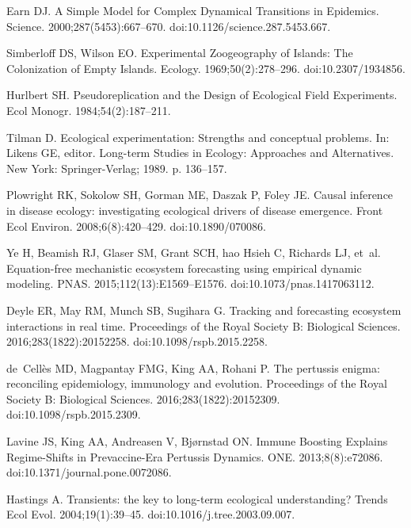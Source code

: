\documentclass[10pt,letterpaper]{article}
\begin{document}
\begin{thebibliography}{10}
Earn DJ.
\newblock A Simple Model for Complex Dynamical Transitions in Epidemics.
\newblock Science. 2000;287(5453):667--670.
\newblock doi:{10.1126/science.287.5453.667}.

Simberloff DS, Wilson EO.
\newblock Experimental Zoogeography of Islands: The Colonization of Empty
  Islands.
\newblock Ecology. 1969;50(2):278--296.
\newblock doi:{10.2307/1934856}.

Hurlbert SH.
\newblock Pseudoreplication and the Design of Ecological Field Experiments.
\newblock Ecol Monogr. 1984;54(2):187--211.

Tilman D.
\newblock Ecological experimentation: Strengths and conceptual problems.
\newblock In: Likens GE, editor. Long-term Studies in Ecology: Approaches and
  Alternatives. New York: Springer-Verlag; 1989. p. 136--157.

Plowright RK, Sokolow SH, Gorman ME, Daszak P, Foley JE.
\newblock Causal inference in disease ecology: investigating ecological drivers
  of disease emergence.
\newblock Front Ecol Environ. 2008;6(8):420--429.
\newblock doi:{10.1890/070086}.

Ye H, Beamish RJ, Glaser SM, Grant SCH, hao Hsieh C, Richards LJ, et~al.
\newblock Equation-free mechanistic ecosystem forecasting using empirical
  dynamic modeling.
\newblock PNAS. 2015;112(13):E1569--E1576.
\newblock doi:{10.1073/pnas.1417063112}.

Deyle ER, May RM, Munch SB, Sugihara G.
\newblock Tracking and forecasting ecosystem interactions in real time.
\newblock Proceedings of the Royal Society B: Biological Sciences.
  2016;283(1822):20152258.
\newblock doi:{10.1098/rspb.2015.2258}.

de~Cell{\`{e}}s MD, Magpantay FMG, King AA, Rohani P.
\newblock The pertussis enigma: reconciling epidemiology, immunology and
  evolution.
\newblock Proceedings of the Royal Society B: Biological Sciences.
  2016;283(1822):20152309.
\newblock doi:{10.1098/rspb.2015.2309}.

Lavine JS, King AA, Andreasen V, Bj{\o}rnstad ON.
\newblock Immune Boosting Explains Regime-Shifts in Prevaccine-Era Pertussis
  Dynamics.
 {ONE}. 2013;8(8):e72086.
\newblock doi:{10.1371/journal.pone.0072086}.

Hastings A.
\newblock Transients: the key to long-term ecological understanding?
\newblock Trends Ecol Evol. 2004;19(1):39--45.
\newblock doi:{10.1016/j.tree.2003.09.007}.


\end{thebibliography}
\end{document}
